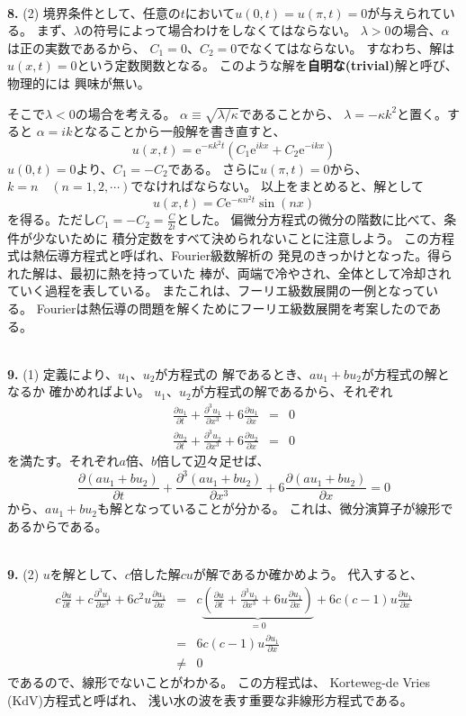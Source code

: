 \documentclass{jarticle}
\newcommand{\ans}[2]{\noindent\\ {\bf \large #1.} (#2)}
\newcommand{\e}{\mathrm e}
\begin{document}
\ans{8}{2}
境界条件として、任意の$t$において$u(0,t) = u(\pi,t) = 0$が与えられている。
まず、$\lambda$の符号によって場合わけをしなくてはならない。
$\lambda>0$の場合、$\alpha$は正の実数であるから、
$C_1 = 0$、$C_2 = 0$でなくてはならない。
すなわち、解は$u(x,t)=0$という定数関数となる。
このような解を{\bf 自明な(trivial)}解と呼び、物理的には
興味が無い。

そこで$\lambda <0$の場合を考える。
$\alpha \equiv \sqrt{\lambda/\kappa}$であることから、
$\lambda = -\kappa k^2$と置く。すると
$\alpha = i k$となることから一般解を書き直すと、
$$
  u(x,t) = \e^{- \kappa k^2 t}
  \left(
  C_1 \e^{ikx} +
  C_2 \e^{-ikx}
  \right)
$$
$u(0,t) = 0$より、$C_1 = - C_2$である。
さらに$u(\pi,t) = 0$から、$k = n \quad (n = 1,2,\cdots)$でなければならない。
以上をまとめると、解として
$$u(x,t) = C \e^{- \kappa n^2 t} \sin(nx)$$
を得る。ただし$C_1 = - C_2 = \displaystyle\frac{C}{2i}$とした。
偏微分方程式の微分の階数に比べて、条件が少ないために
積分定数をすべて決められないことに注意しよう。
この方程式は熱伝導方程式と呼ばれ、Fourier級数解析の
発見のきっかけとなった。得られた解は、最初に熱を持っていた
棒が、両端で冷やされ、全体として冷却されていく過程を表している。
またこれは、フーリエ級数展開の一例となっている。
Fourierは熱伝導の問題を解くためにフーリエ級数展開を考案したのである。

\ans{9}{1}
定義により、$u_1$、$u_2$が方程式の
解であるとき、$au_1 + bu_2$が方程式の解となるか
確かめればよい。
$u_1$、$u_2$が方程式の解であるから、それぞれ
\begin{eqnarray}
  \frac{\partial u_1}{\partial t} +  \frac{\partial^3 u_1}{\partial x^3} + 6  \frac{\partial u_1}{\partial x}  &=& 0\\
  \frac{\partial u_2}{\partial t} +  \frac{\partial^3 u_2}{\partial x^3} + 6  \frac{\partial u_2}{\partial x}  &=& 0
\end{eqnarray}
を満たす。それぞれ$a$倍、$b$倍して辺々足せば、
\begin{equation}
  \frac{\partial (au_1+bu_2)}{\partial t} +  \frac{\partial^3 (au_1+bu_2)}{\partial x^3} + 6  \frac{\partial (au_1+bu_2)}{\partial x}  = 0
\end{equation}
から、$au_1+bu_2$も解となっていることが分かる。
これは、微分演算子が線形であるからである。

\ans{9}{2}
$u$を解として、$c$倍した解$cu$が解であるか確かめよう。
代入すると、
\begin{eqnarray}
  c \frac{\partial u}{\partial t} +  c\frac{\partial^3 u_1}{\partial x^3} + 6 c^2 u\frac{\partial u_1}{\partial x}  &=&
  c \underbrace{\left( \frac{\partial u}{\partial t} +  \frac{\partial^3 u_1}{\partial x^3} + 6 u \frac{\partial u_1}{\partial x} \right)}_{=0} + 6c(c-1)u \frac{\partial u_1}{\partial x} \\
  &=& 6c(c-1) u\frac{\partial u_1}{\partial x} \\
  &\ne& 0
\end{eqnarray}
であるので、線形でないことがわかる。
この方程式は、 Korteweg-de Vries (KdV)方程式と呼ばれ、
浅い水の波を表す重要な非線形方程式である。
\end{document}
